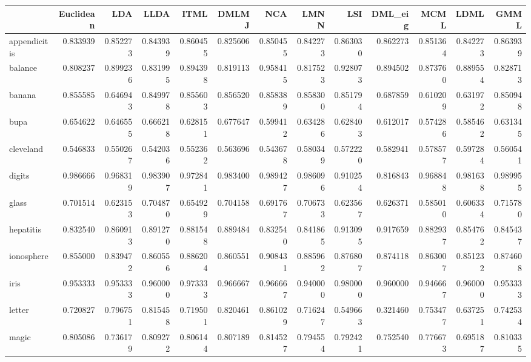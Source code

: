 \begin{tabular}{lrrrrrrrrrrrr}
\toprule
{} &  Euclidean &       LDA &      LLDA &      ITML &     DMLMJ &       NCA &      LMNN &       LSI &   DML\_eig &      MCML &      LDML &      GMML \\
\midrule
appendicitis    &   0.833939 &  0.852273 &  0.843939 &  0.860455 &  0.825606 &  0.850455 &  0.842273 &  0.863030 &  0.862273 &  0.851364 &  0.842273 &  0.863939 \\
balance         &   0.808237 &  0.899236 &  0.831995 &  0.894398 &  0.819113 &  0.958415 &  0.817523 &  0.928073 &  0.894502 &  0.873760 &  0.889554 &  0.828713 \\
banana          &   0.855585 &  0.646943 &  0.849978 &  0.855603 &  0.856520 &  0.858389 &  0.858300 &  0.851794 &  0.687859 &  0.610209 &  0.631972 &  0.850948 \\
bupa            &   0.654622 &  0.646555 &  0.666218 &  0.628151 &  0.677647 &  0.599412 &  0.634286 &  0.628403 &  0.612017 &  0.574286 &  0.585462 &  0.631345 \\
cleveland       &   0.546833 &  0.550267 &  0.542036 &  0.552362 &  0.563696 &  0.543678 &  0.580349 &  0.572220 &  0.582941 &  0.578577 &  0.597284 &  0.560541 \\
digits          &   0.986666 &  0.968319 &  0.983907 &  0.972841 &  0.983400 &  0.989427 &  0.986096 &  0.910254 &  0.816843 &  0.968848 &  0.981638 &  0.989955 \\
glass           &   0.701514 &  0.623153 &  0.704870 &  0.654929 &  0.704158 &  0.691767 &  0.706733 &  0.623567 &  0.626371 &  0.585010 &  0.606334 &  0.715780 \\
hepatitis       &   0.832540 &  0.860913 &  0.891270 &  0.881548 &  0.889484 &  0.832540 &  0.841865 &  0.913095 &  0.917659 &  0.882937 &  0.854762 &  0.845437 \\
ionosphere      &   0.855000 &  0.839472 &  0.860556 &  0.886204 &  0.860551 &  0.908431 &  0.885962 &  0.876807 &  0.874118 &  0.863007 &  0.851232 &  0.874608 \\
iris            &   0.953333 &  0.953333 &  0.960000 &  0.973333 &  0.966667 &  0.966667 &  0.940000 &  0.980000 &  0.960000 &  0.946667 &  0.960000 &  0.953333 \\
letter          &   0.720827 &  0.796751 &  0.815458 &  0.719501 &  0.820461 &  0.861029 &  0.716247 &  0.549663 &  0.321460 &  0.753477 &  0.637251 &  0.742534 \\
magic           &   0.805086 &  0.736179 &  0.809272 &  0.806144 &  0.807189 &  0.814527 &  0.794554 &  0.792421 &  0.752540 &  0.776673 &  0.695187 &  0.810335 \\

\end{tabular}
